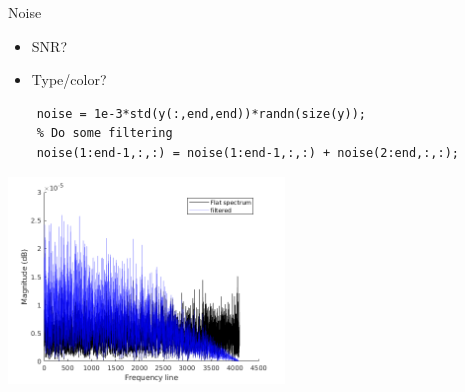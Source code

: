 \documentclass[9pt]{beamer}
\begin{document}
\begin{frame}[fragile]{Noise}
  \begin{itemize}
  \item SNR?
  \item Type/color?
  \end{itemize}

  \begin{lstlisting}
    noise = 1e-3*std(y(:,end,end))*randn(size(y));
    % Do some filtering
    noise(1:end-1,:,:) = noise(1:end-1,:,:) + noise(2:end,:,:);
  \end{lstlisting}
  \begin{center}
  \includegraphics[width=0.55\textwidth]{fig/noise}
\end{center}
\end{frame}






\end{document}
